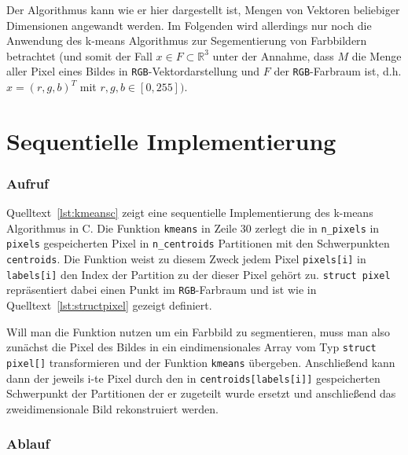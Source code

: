 \documentclass[
    bibliography=totoc, cd=lightcolor, cdmath=false, ngerman]{tudscrreprt}
\begin{document}
Der Algorithmus kann wie er hier dargestellt ist, Mengen von Vektoren beliebiger
Dimensionen angewandt werden. Im Folgenden wird allerdings nur noch die Anwendung
des k-means Algorithmus zur Segementierung von Farbbildern betrachtet (und
somit der Fall $x \in F \subset \mathbb{R}^3$ unter der Annahme, dass $M$ die
Menge aller Pixel eines Bildes in \texttt{RGB}-Vektordarstellung und $F$ der
\texttt{RGB}-Farbraum ist, d.h. $x = (r, g, b)^T$ mit $r, g, b \in [0,
255])$.

\section{Sequentielle Implementierung}

\subsubsection{Aufruf}

Quelltext~\ref{lst:kmeansc} zeigt eine sequentielle Implementierung des k-means
Algorithmus in C. Die Funktion \texttt{kmeans} in Zeile 30 zerlegt die in
\texttt{n\_pixels} in \texttt{pixels} gespeicherten Pixel in
\texttt{n\_centroids} Partitionen mit den Schwerpunkten \texttt{centroids}. Die
Funktion weist zu diesem Zweck jedem Pixel \texttt{pixels[i]} in
\texttt{labels[i]} den Index der Partition zu der dieser Pixel gehört zu.
\texttt{struct pixel} repräsentiert dabei einen Punkt im \texttt{RGB}-Farbraum
und ist wie in Quelltext~\ref{lst:structpixel} gezeigt definiert.



Will man die Funktion nutzen um ein Farbbild zu segmentieren, muss man also
zunächst die Pixel des Bildes in ein eindimensionales Array vom Typ
\texttt{struct pixel[]} transformieren und der Funktion \texttt{kmeans}
übergeben. Anschließend kann dann der jeweils i-te Pixel durch den in
\texttt{centroids[labels[i]]} gespeicherten Schwerpunkt der Partitionen der er
zugeteilt wurde ersetzt und anschließend das zweidimensionale Bild
rekonstruiert werden.

\subsubsection{Ablauf}
\end{document}
